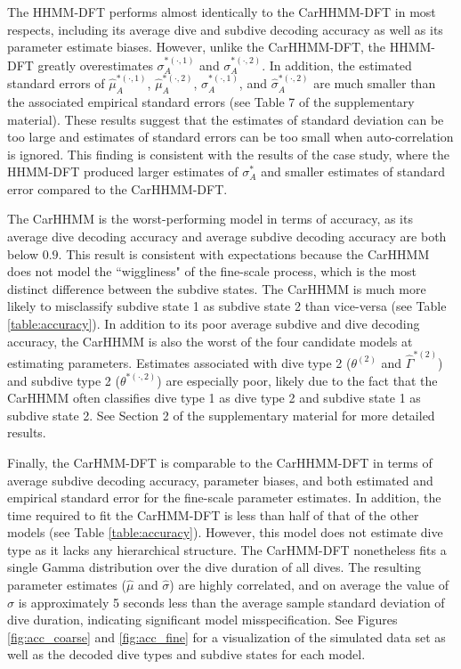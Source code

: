 The HHMM-DFT performs almost identically to the CarHHMM-DFT in most respects, including its average dive and subdive decoding accuracy as well as its parameter estimate biases. However, unlike the CarHHMM-DFT, the HHMM-DFT greatly overestimates $\sigma_A^{*(\cdot,1)}$ and $\sigma_A^{*(\cdot,2)}$. In addition, the estimated standard errors of $\hat \mu_A^{*(\cdot,1)}$, $\hat \mu_A^{*(\cdot,2)}$, $\hat \sigma_A^{*(\cdot,1)}$, and $\hat \sigma_A^{*(\cdot,2)}$ are much smaller than the associated empirical standard errors (see Table 7 of the supplementary material). These results suggest that the estimates of standard deviation can be too large and estimates of standard errors can be too small when auto-correlation is ignored. This finding is consistent with the results of the case study, where the HHMM-DFT produced larger estimates of $\sigma_A^*$ and smaller estimates of standard error compared to the CarHHMM-DFT.

The CarHHMM is the worst-performing model in terms of accuracy, as its average dive decoding accuracy and average subdive decoding accuracy are both below $0.9$. This result is consistent with expectations because the CarHHMM does not model the ``wiggliness" of the fine-scale process, which is the most distinct difference between the subdive states. The CarHHMM is much more likely to misclassify subdive state 1 as subdive state 2 than vice-versa (see Table \ref{table:accuracy}). In addition to its poor average subdive and dive decoding accuracy, the CarHHMM is also the worst of the four candidate models at estimating parameters. Estimates associated with dive type 2 ($\theta^{(2)}$ and $\hat \Gamma^{*(2)}$) and subdive type 2 ($\theta^{*(\cdot,2)}$) are especially poor, likely due to the fact that the CarHHMM often classifies dive type 1 as dive type 2 and subdive state 1 as subdive state 2. See Section 2 of the supplementary material for more detailed results.

Finally, the CarHMM-DFT is comparable to the CarHHMM-DFT in terms of average subdive decoding accuracy, parameter biases, and both estimated and empirical standard error for the fine-scale parameter estimates. In addition, the time required to fit the CarHMM-DFT is less than half of that of the other models (see Table \ref{table:accuracy}). However, this model does not estimate dive type as it lacks any hierarchical structure. The CarHMM-DFT nonetheless fits a single Gamma distribution over the dive duration of all dives. The resulting parameter estimates ($\hat \mu$ and $\hat \sigma$) are highly correlated, and on average the value of $\hat \sigma$ is approximately 5 seconds less than the average sample standard deviation of dive duration, indicating significant model misspecification. See Figures \ref{fig:acc_coarse} and \ref{fig:acc_fine} for a visualization of the simulated data set as well as the decoded dive types and subdive states for each model.